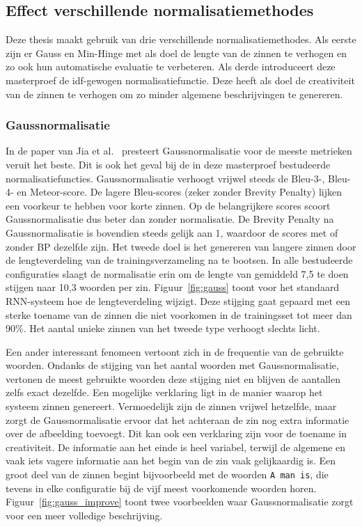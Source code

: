 \subsection{Effect verschillende normalisatiemethodes}
Deze thesis maakt gebruik van drie verschillende normalisatiemethodes. Als eerste zijn er Gauss en Min-Hinge met als doel de lengte van de zinnen te verhogen en zo ook hun automatische evaluatie te verbeteren. Als derde introduceert deze masterproef de idf-gewogen normalisatiefunctie. Deze heeft als doel de creativiteit van de zinnen te verhogen om zo minder algemene beschrijvingen te genereren.

\subsubsection{Gaussnormalisatie}
In de paper van Jia et al.~\cite{Fernando2015} presteert Gaussnormalisatie voor de meeste metrieken veruit het beste. 
Dit is ook het geval bij de in deze masterproef bestudeerde normalisatiefuncties. Gaussnormalisatie verhoogt vrijwel steeds de Bleu-3-, Bleu-4- en Meteor-score. De lagere Bleu-scores (zeker zonder Brevity Penalty) lijken een voorkeur te hebben voor korte zinnen. Op de belangrijkere scores scoort Gaussnormalisatie dus beter dan zonder normalisatie. De Brevity Penalty na Gaussnormalisatie is bovendien steeds gelijk aan 1, waardoor de scores met of zonder BP dezelfde zijn.
Het tweede doel is het genereren van langere zinnen door de lengteverdeling van de trainingsverzameling na te bootsen.
In alle bestudeerde configuraties slaagt de normalisatie erin om de lengte van gemiddeld 7,5 te doen stijgen naar 10,3 woorden per zin. Figuur~\ref{fig:gauss} toont voor het standaard RNN-systeem hoe de lengteverdeling wijzigt. Deze stijging gaat gepaard met een sterke toename van de zinnen die niet voorkomen in de trainingsset tot meer dan 90\%. Het aantal unieke zinnen van het tweede type verhoogt slechts licht. 

Een ander interessant fenomeen vertoont zich in de frequentie van de gebruikte woorden. Ondanks de stijging van het aantal woorden met Gaussnormalisatie, vertonen de meest gebruikte woorden deze stijging niet en blijven de aantallen zelfs exact dezelfde. Een mogelijke verklaring ligt in de manier waarop het systeem zinnen genereert. Vermoedelijk zijn de zinnen vrijwel hetzelfde, maar zorgt de Gaussnormalisatie ervoor dat het achteraan de zin nog extra informatie over de afbeelding toevoegt. Dit kan ook een verklaring zijn voor de toename in creativiteit. De informatie aan het einde is heel variabel, terwijl de algemene en vaak iets vagere informatie aan het begin van de zin vaak gelijkaardig is. Een groot deel van de zinnen begint bijvoorbeeld met de woorden \texttt{A man is}, die tevens in elke configuratie bij de vijf meest voorkomende woorden horen. Figuur~\ref{fig:gauss_improve} toont twee voorbeelden waar Gaussnormalisatie zorgt voor een meer volledige beschrijving.

